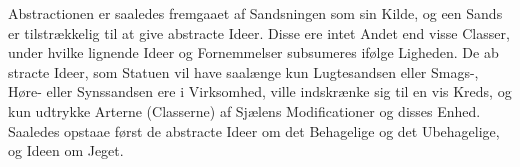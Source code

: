 \documentclass[12pt,a4paper]{book}
\begin{document}
Abstractionen er saaledes fremgaaet af Sandsningen som sin
Kilde, og een Sands er tilstrækkelig til at give abstracte Ideer.
Disse ere intet Andet end visse Classer, under hvilke lignende
Ideer og Fornemmelser subsumeres ifølge Ligheden. De ab\-%
stracte Ideer, som Statuen vil have saalænge kun Lugtesandsen
eller Smags-, Høre- eller Synssandsen ere i Virksomhed, ville
indskrænke sig til en vis Kreds, og kun udtrykke Arterne
(Classerne) af Sjælens Modificationer og disses Enhed. Saaledes
opstaae først de abstracte Ideer om det Behagelige og det
Ubehagelige, og Ideen om Jeget.
\end{document}
